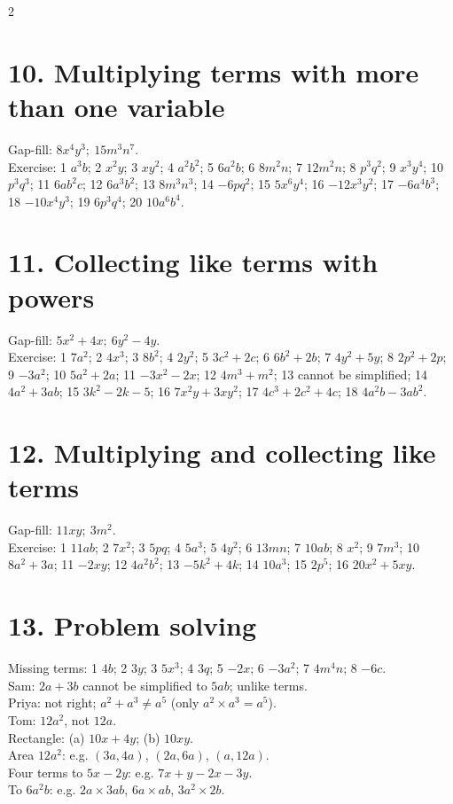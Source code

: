 \documentclass[12pt,a4paper]{article}
\begin{document}
\begin{multicols}{2}
\section*{10. Multiplying terms with more than one variable}
Gap-fill: \(8x^4y^3;\ 15m^3n^7\).\\
Exercise: 1 \(a^3b\); 2 \(x^2y\); 3 \(xy^2\); 4 \(a^2b^2\); 5 \(6a^2b\); 6 \(8m^2n\); 7 \(12m^2n\); 8 \(p^3q^2\); 9 \(x^3y^4\); 10 \(p^3q^3\); 11 \(6ab^2c\); 12 \(6a^3b^2\); 13 \(8m^3n^3\); 14 \(-6pq^2\); 15 \(5x^6y^4\); 16 \(-12x^3y^2\); 17 \(-6a^4b^3\); 18 \(-10x^4y^3\); 19 \(6p^3q^4\); 20 \(10a^6b^4\).

\section*{11. Collecting like terms with powers}
Gap-fill: \(5x^2+4x;\ 6y^2-4y\).\\
Exercise: 1 \(7a^2\); 2 \(4x^3\); 3 \(8b^2\); 4 \(2y^2\); 5 \(3c^2+2c\); 6 \(6b^2+2b\); 7 \(4y^2+5y\); 8 \(2p^2+2p\); 9 \(-3a^2\); 10 \(5a^2+2a\); 11 \(-3x^2-2x\); 12 \(4m^3+m^2\); 13 cannot be simplified; 14 \(4a^2+3ab\); 15 \(3k^2-2k-5\); 16 \(7x^2y+3xy^2\); 17 \(4c^3+2c^2+4c\); 18 \(4a^2b-3ab^2\).

\section*{12. Multiplying and collecting like terms}
Gap-fill: \(11xy;\ 3m^2\).\\
Exercise: 1 \(11ab\); 2 \(7x^2\); 3 \(5pq\); 4 \(5a^3\); 5 \(4y^2\); 6 \(13mn\); 7 \(10ab\); 8 \(x^2\); 9 \(7m^3\); 10 \(8a^2+3a\); 11 \(-2xy\); 12 \(4a^2b^2\); 13 \(-5k^2+4k\); 14 \(10a^3\); 15 \(2p^5\); 16 \(20x^2+5xy\).

\section*{13. Problem solving}
Missing terms: 1 \(4b\); 2 \(3y\); 3 \(5x^3\); 4 \(3q\); 5 \(-2x\); 6 \(-3a^2\); 7 \(4m^4n\); 8 \(-6c\).\\
Sam: \(2a+3b\) cannot be simplified to \(5ab\); unlike terms.\\
Priya: not right; \(a^2+a^3\neq a^5\) (only \(a^2\times a^3=a^5\)).\\
Tom: \(12a^2\), not \(12a\).\\
Rectangle: (a) \(10x+4y\); (b) \(10xy\).\\
Area \(12a^2\): e.g. \((3a,4a)\), \((2a,6a)\), \((a,12a)\).\\
Four terms to \(5x-2y\): e.g. \(7x+y-2x-3y\).\\
To \(6a^2b\): e.g. \(2a\times3ab\), \(6a\times ab\), \(3a^2\times2b\).

\end{multicols}
\end{document}
